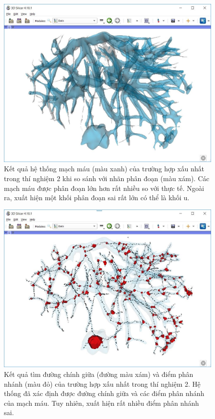 	\begin{figure}[h!]
		\includegraphics[width=\textwidth]{figures/result_e2_worst_comparison}
		\caption[Kết quả hệ thống mạch máu của trường hợp xấu nhất trong thí nghiệm 2 và nhãn phân đoạn.]{Kết quả hệ thống mạch máu (màu xanh) của trường hợp xấu nhất trong thí nghiệm 2 khi so sánh với nhãn phân đoạn (màu xám). Các mạch máu được phân đoạn lớn hơn rất nhiều so với thực tế. Ngoài ra, xuất hiện một khối phân đoạn sai rất lớn có thể là khối u.}
		\label{fig:result_e2_worst_comparison}
	\end{figure}
	\begin{figure}[h!]
		\includegraphics[width=\textwidth]{figures/result_e2_worst_skeleton_branching_point}
		\caption[Kết quả tìm đường chính giữa và điểm phân nhánh của trường hợp xấu nhất trong thí nghiệm 2.]{Kết quả tìm đường chính giữa (đường màu xám) và điểm phân nhánh (màu đỏ) của trường hợp xấu nhất trong thí nghiệm 2. Hệ thống đã xác định được đường chính giữa và các điểm phân nhánh của mạch máu. Tuy nhiên, xuất hiện rất nhiều điểm phân nhánh sai.}
		\label{fig:result_e2_worst_skeleton_branching_point}
	\end{figure}

